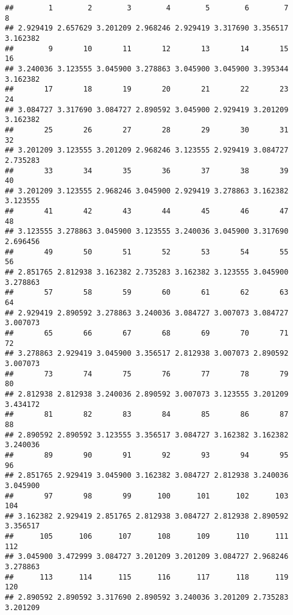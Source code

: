 \documentclass[
]{article}
\newenvironment{Shaded}{\begin{snugshade}}{\end{snugshade}}
\newcommand{\CommentTok}[1]{\textcolor[rgb]{0.56,0.35,0.01}{\textit{#1}}}
\newcommand{\DataTypeTok}[1]{\textcolor[rgb]{0.13,0.29,0.53}{#1}}
\newcommand{\DecValTok}[1]{\textcolor[rgb]{0.00,0.00,0.81}{#1}}
\newcommand{\KeywordTok}[1]{\textcolor[rgb]{0.13,0.29,0.53}{\textbf{#1}}}
\newcommand{\NormalTok}[1]{#1}
\newcommand{\OperatorTok}[1]{\textcolor[rgb]{0.81,0.36,0.00}{\textbf{#1}}}
\begin{document}
\begin{verbatim}
##        1        2        3        4        5        6        7        8 
## 2.929419 2.657629 3.201209 2.968246 2.929419 3.317690 3.356517 3.162382 
##        9       10       11       12       13       14       15       16 
## 3.240036 3.123555 3.045900 3.278863 3.045900 3.045900 3.395344 3.162382 
##       17       18       19       20       21       22       23       24 
## 3.084727 3.317690 3.084727 2.890592 3.045900 2.929419 3.201209 3.162382 
##       25       26       27       28       29       30       31       32 
## 3.201209 3.123555 3.201209 2.968246 3.123555 2.929419 3.084727 2.735283 
##       33       34       35       36       37       38       39       40 
## 3.201209 3.123555 2.968246 3.045900 2.929419 3.278863 3.162382 3.123555 
##       41       42       43       44       45       46       47       48 
## 3.123555 3.278863 3.045900 3.123555 3.240036 3.045900 3.317690 2.696456 
##       49       50       51       52       53       54       55       56 
## 2.851765 2.812938 3.162382 2.735283 3.162382 3.123555 3.045900 3.278863 
##       57       58       59       60       61       62       63       64 
## 2.929419 2.890592 3.278863 3.240036 3.084727 3.007073 3.084727 3.007073 
##       65       66       67       68       69       70       71       72 
## 3.278863 2.929419 3.045900 3.356517 2.812938 3.007073 2.890592 3.007073 
##       73       74       75       76       77       78       79       80 
## 2.812938 2.812938 3.240036 2.890592 3.007073 3.123555 3.201209 3.434172 
##       81       82       83       84       85       86       87       88 
## 2.890592 2.890592 3.123555 3.356517 3.084727 3.162382 3.162382 3.240036 
##       89       90       91       92       93       94       95       96 
## 2.851765 2.929419 3.045900 3.162382 3.084727 2.812938 3.240036 3.045900 
##       97       98       99      100      101      102      103      104 
## 3.162382 2.929419 2.851765 2.812938 3.084727 2.812938 2.890592 3.356517 
##      105      106      107      108      109      110      111      112 
## 3.045900 3.472999 3.084727 3.201209 3.201209 3.084727 2.968246 3.278863 
##      113      114      115      116      117      118      119      120 
## 2.890592 2.890592 3.317690 2.890592 3.240036 3.201209 2.735283 3.201209
\end{verbatim}

\begin{Shaded}
\end{Shaded}
\end{document}

